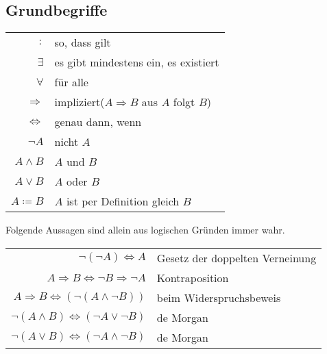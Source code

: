 \documentclass[../ana1.tex]{subfiles}
\begin{document}
\subsection{Grundbegriffe}
\begin{notation}\leavevmode
	\begin{center}
		\begin{tabular}{r|l}
			\(\colon\)               & \glqq so, dass gilt\grqq                                                    \\
			\(\exists\)         & \glqq es gibt mindestens ein\grqq , \glqq es existiert\grqq                 \\
			\(\forall\)         & \glqq für alle\grqq                                                         \\
			\(\Rightarrow\)     & \glqq impliziert\grqq(\(A \Rightarrow B\) \glqq aus \(A\) folgt \(B\)\grqq) \\
			\(\Leftrightarrow\) & \glqq genau dann, wenn\grqq                                                 \\
			\(\neg A\)          & nicht \(A\)                                                                 \\
			\(A \wedge B\)      & \(A\) und \(B\)                                                             \\
			\(A \vee B\)        & \(A\) oder \(B\)                                                            \\
			\(A \coloneqq B\)          & \(A\) ist per Definition gleich \(B\)
		\end{tabular}
	\end{center}
\end{notation}

\begin{satz}
	Folgende Aussagen sind allein aus logischen Gründen immer wahr.
	\begin{center}
		\begin{tabular}{rl}
			\(\neg(\neg A) \Leftrightarrow A\)                            & Gesetz der doppelten Verneinung \\
			\(A \Rightarrow B \Leftrightarrow \neg B \Rightarrow \neg A\) & Kontraposition                  \\
			\(A \Rightarrow B \Leftrightarrow (\neg (A \wedge \neg B))\)  & beim Widerspruchsbeweis         \\
			\(\neg(A \wedge B) \Leftrightarrow (\neg A \vee \neg B)\)     & de Morgan                       \\
			\(\neg(A \vee B) \Leftrightarrow (\neg A \wedge \neg B)\)     & de Morgan                       \\
		\end{tabular}
	\end{center}
\end{satz}
\end{document}
